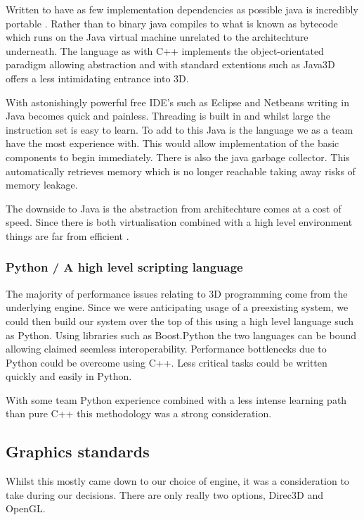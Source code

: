 Written to have as few implementation dependencies as possible java
is incredibly portable \cite{AboutJava}. Rather than to binary java
compiles to what is known as bytecode which runs on the Java virtual
machine unrelated to the architechture underneath. The language as
with C++ implements the object-orientated paradigm allowing abstraction
and with standard extentions such as Java3D offers a less intimidating
entrance into 3D.

With astonishingly powerful free IDE's such as Eclipse and Netbeans
writing in Java becomes quick and painless. Threading is built in
and whilst large the instruction set is easy to learn. To add to this
Java is the language we as a team have the most experience with. This
would allow implementation of the basic components to begin immediately.
There is also the java garbage collector. This automatically retrieves
memory which is no longer reachable taking away risks of memory leakage.

The downside to Java is the abstraction from architechture comes at
a cost of speed. Since there is both virtualisation combined with
a high level environment things are far from efficient \cite{Jelovic}. 


\subsubsection{Python / A high level scripting language}

The majority of performance issues relating to 3D programming come
from the underlying engine. Since we were anticipating usage of a
preexisting system, we could then build our system over the top of
this using a high level language such as Python. Using libraries such
as Boost.Python \cite{boostPython} the two languages can be bound
allowing claimed seemless interoperability. Performance bottlenecks
due to Python could be overcome using C++. Less critical tasks could
be written quickly and easily in Python.

With some team Python experience combined with a less intense learning
path than pure C++ this methodology was a strong consideration.


\subsection{Graphics standards}

Whilst this mostly came down to our choice of engine, it was a consideration
to take during our decisions. There are only really two options, Direc3D
and OpenGL.


